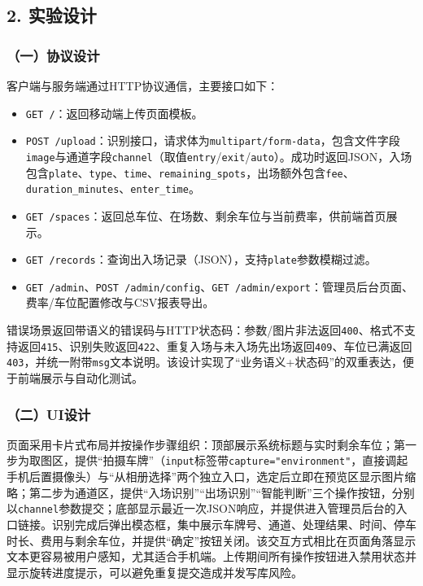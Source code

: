 \documentclass[12pt,a4paper]{article}
\begin{document}
\subsection*{2. 实验设计}
\subsubsection*{（一）协议设计}
客户端与服务端通过HTTP协议通信，主要接口如下：
\begin{itemize}
  \item \texttt{GET /}：返回移动端上传页面模板。
  \item \texttt{POST /upload}：识别接口，请求体为\texttt{multipart/form-data}，包含文件字段\texttt{image}与通道字段\texttt{channel}（取值\texttt{entry}/\texttt{exit}/\texttt{auto}）。成功时返回JSON，入场包含\texttt{plate}、\texttt{type}、\texttt{time}、\texttt{remaining\_spots}，出场额外包含\texttt{fee}、\texttt{duration\_minutes}、\texttt{enter\_time}。
  \item \texttt{GET /spaces}：返回总车位、在场数、剩余车位与当前费率，供前端首页展示。
  \item \texttt{GET /records}：查询出入场记录（JSON），支持\texttt{plate}参数模糊过滤。
  \item \texttt{GET /admin}、\texttt{POST /admin/config}、\texttt{GET /admin/export}：管理员后台页面、费率/车位配置修改与CSV报表导出。
\end{itemize}
错误场景返回带语义的错误码与HTTP状态码：参数/图片非法返回\texttt{400}、格式不支持返回\texttt{415}、识别失败返回\texttt{422}、重复入场与未入场先出场返回\texttt{409}、车位已满返回\texttt{403}，并统一附带\texttt{msg}文本说明。该设计实现了“业务语义+状态码”的双重表达，便于前端展示与自动化测试。

\subsubsection*{（二）UI设计}
页面采用卡片式布局并按操作步骤组织：顶部展示系统标题与实时剩余车位；第一步为取图区，提供“拍摄车牌”（\texttt{input}标签带\texttt{capture="environment"}，直接调起手机后置摄像头）与“从相册选择”两个独立入口，选定后立即在预览区显示图片缩略；第二步为通道区，提供“入场识别”“出场识别”“智能判断”三个操作按钮，分别以\texttt{channel}参数提交；底部显示最近一次JSON响应，并提供进入管理员后台的入口链接。识别完成后弹出模态框，集中展示车牌号、通道、处理结果、时间、停车时长、费用与剩余车位，并提供“确定”按钮关闭。该交互方式相比在页面角落显示文本更容易被用户感知，尤其适合手机端。上传期间所有操作按钮进入禁用状态并显示旋转进度提示，可以避免重复提交造成并发写库风险。
\end{document}
